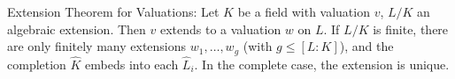 Extension Theorem for Valuations: Let $K$ be a field with valuation $v$, $L/K$ an algebraic extension. Then $v$ extends to a valuation $w$ on $L$. If $L/K$ is finite, there are only finitely many extensions $w_1, \ldots, w_g$ (with $g \leq [L:K]$), and the completion $\hat{K}$ embeds into each $\hat{L}_i$. In the complete case, the extension is unique.
